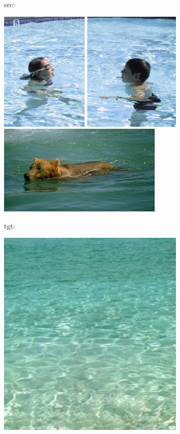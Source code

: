 \documentclass[12pt, a4paper, oneside]{report}
\begin{document}
	\noindent src: 
	
	\centerline{
	\includegraphics[scale=0.5]{src1.jpg}
	\includegraphics[scale=0.5]{src2.jpg}
	\includegraphics[scale=0.7]{src3.jpg}
}

	\noindent tgt: 	
	
	\centerline{	
	\includegraphics[scale=0.5]{tgt.jpg}
}
	
\end{document}
